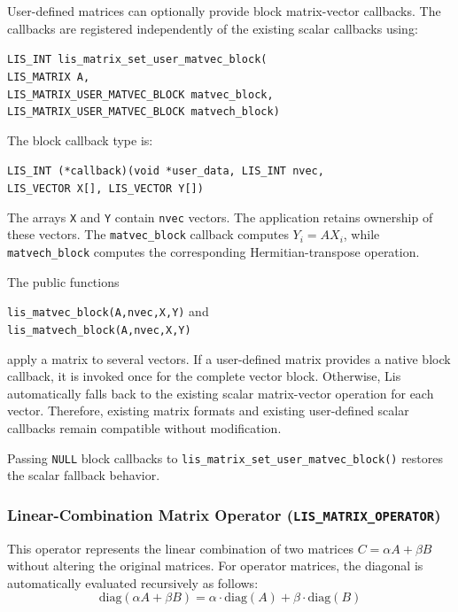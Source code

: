 \documentclass[a4paper]{article}
\begin{document}
User-defined matrices can optionally provide block matrix-vector callbacks.
The callbacks are registered independently of the existing scalar callbacks
using:

\noindent
\texttt{LIS\_INT lis\_matrix\_set\_user\_matvec\_block(}\\
\texttt{\hspace*{5mm}LIS\_MATRIX A,}\\
\texttt{\hspace*{5mm}LIS\_MATRIX\_USER\_MATVEC\_BLOCK matvec\_block,}\\
\texttt{\hspace*{5mm}LIS\_MATRIX\_USER\_MATVEC\_BLOCK matvech\_block)}

The block callback type is:

\noindent
\texttt{LIS\_INT (*callback)(void *user\_data, LIS\_INT nvec,}\\
\texttt{\hspace*{28mm}LIS\_VECTOR X[], LIS\_VECTOR Y[])}

The arrays \texttt{X} and \texttt{Y} contain \texttt{nvec} vectors.
The application retains ownership of these vectors.  The
\texttt{matvec\_block} callback computes $Y_i=A X_i$, while
\texttt{matvech\_block} computes the corresponding Hermitian-transpose
operation.

The public functions

\noindent
\texttt{lis\_matvec\_block(A,nvec,X,Y)} and\\
\texttt{lis\_matvech\_block(A,nvec,X,Y)}

apply a matrix to several vectors.  If a user-defined matrix provides a
native block callback, it is invoked once for the complete vector block.
Otherwise, Lis automatically falls back to the existing scalar
matrix-vector operation for each vector.  Therefore, existing matrix
formats and existing user-defined scalar callbacks remain compatible
without modification.

Passing \texttt{NULL} block callbacks to
\texttt{lis\_matrix\_set\_user\_matvec\_block()} restores the scalar
fallback behavior.

\subsubsection{Linear-Combination Matrix Operator (\texttt{LIS\_MATRIX\_OPERATOR})}
This operator represents the linear combination of two matrices $C = \alpha A + \beta B$ without altering the original matrices. For operator matrices, the diagonal is automatically evaluated recursively as follows:
\[
\mathrm{diag}(\alpha A + \beta B) = \alpha \cdot \mathrm{diag}(A) + \beta \cdot \mathrm{diag}(B)
\]
\end{document}
